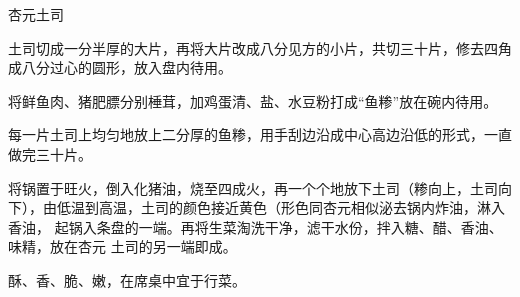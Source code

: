 \begin{recipe}{杏元土司}

\ingredients


\preparation

\step 土司切成一分半厚的大片，再将大片改成八分见方的小片，共切三十片，修去四角
成八分过心的圆形，放入盘内待用。

\step 将鲜鱼肉、猪肥膘分别棰茸，加鸡蛋清、盐、水豆粉打成“鱼糁”放在碗内待用。

\step 每一片土司上均匀地放上二分厚的鱼糁，用手刮边沿成中心高边沿低的形式，一直
做完三十片。

\step 将锅置于旺火，倒入化猪油，烧至四成火，再一个个地放下土司（糁向上，土司向
下），由低温到高温，土司的颜色接近黄色（形色同杏元相似泌去锅内炸油，淋入香油，
起锅入条盘的一端。再将生菜淘洗干净，滤干水份，拌入糖、醋、香油、味精，放在杏元
土司的另一端即成。

\features

酥、香、脆、嫩，在席桌中宜于行菜。

\end{recipe}

